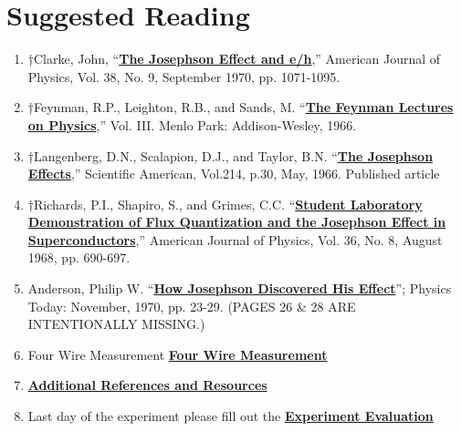 \documentclass{../lab}
\begin{document}
\section{Suggested Reading}
\label{sec:suggestedreading}
\begin{enumerate}
    \item †Clarke, John, ``\href{https://drive.google.com/file/d/1cmbx8od3CdGjQYsxPj0W6-09Mi_pPXy1/view?usp=drive_link}{\textbf{The Josephson Effect and e/h}},'' American Journal of Physics, Vol. 38, No. 9, September 1970, pp. 1071-1095.

    \item †Feynman, R.P., Leighton, R.B., and Sands, M. ``\href{https://drive.google.com/file/d/1EGScyQOk7VSd7jMIJ5CdPItun1lsIwC0/view?usp=drive_link}{\textbf{The Feynman Lectures on Physics}},'' Vol. III. Menlo Park: Addison-Wesley, 1966.

    \item †Langenberg, D.N., Scalapion, D.J., and Taylor, B.N. ``\href{https://berkeley-physics111b.github.io/assets/pdf/oldwebsitestructure/JOS/References/04-Krause_The%20Josephson%20Effects.pdf}{\textbf{The Josephson Effects}},'' Scientific American, Vol.214, p.30, May, 1966. Published article 

    \item †Richards, P.I., Shapiro, S., and Grimes, C.C. ``\href{https://berkeley-physics111b.github.io/assets/pdf/oldwebsitestructure/JOS/References/01-Student_Laboratory_Demonstration.pdf}{\textbf{Student Laboratory Demonstration of Flux Quantization and the Josephson Effect in Superconductors}},'' American Journal of Physics, Vol. 36, No. 8, August 1968, pp. 690-697.

    \item Anderson, Philip W. ``\href{https://berkeley-physics111b.github.io/assets/pdf/oldwebsitestructure/JOS/References/05-How_Josephson_Discovered_his_Effect.pdf}{\textbf{How Josephson Discovered His Effect}}''; Physics Today: November, 1970, pp. 23-29. (PAGES 26 \& 28 ARE INTENTIONALLY MISSING.)

    \item Four Wire Measurement \href{https://berkeley-physics111b.github.io/assets/pdf/oldwebsitestructure/JOS/References/10-Four_Wire_Measurement.pdf}{\textbf{Four Wire Measurement}}

    \item\href{https://berkeley-physics111b.github.io/assets/pdf/oldwebsitestructure/JOS/References/00-JOS_Additional%20References%20and%20Resources_Index.pdf}{\textbf{Additional References and Resources}}

    \item Last day of the experiment please fill out the \href{\ExperimentEvaluation}{\textbf{Experiment Evaluation}}

\end{enumerate}
\end{document}
